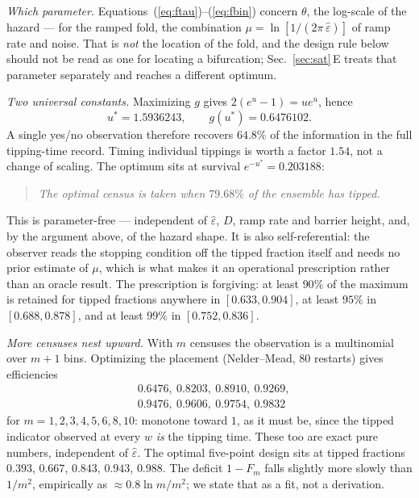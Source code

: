 \documentclass[%
 twocolumn,
 superscriptaddress,
 amsmath,amssymb,
 aps,
 pre,
 floatfix,
]{revtex4-2}
\newcommand{\Sig}{\hat\varepsilon}
\begin{document}
\emph{Which parameter.}  Equations~(\ref{eq:ftau})--(\ref{eq:fbin}) concern $\theta$, the log-scale of the hazard --- for the ramped fold, the combination $\mu=\ln[1/(2\pi\,\Sig)]$ of ramp rate and noise.  That is \emph{not} the location of the fold, and the design rule below should not be read as one for locating a bifurcation; Sec.~\ref{sec:sat}\,E treats that parameter separately and reaches a different optimum.

\emph{Two universal constants.}  Maximizing $g$ gives $2(e^u-1)=u e^u$, hence
\begin{equation}
\label{eq:ustar}
u^\ast=1.5936243,\qquad g(u^\ast)=0.6476102 .
\end{equation}
A single yes/no observation therefore recovers $64.8\%$ of the information in the full tipping-time record.  Timing individual tippings is worth a factor $1.54$, not a change of scaling.  The optimum sits at survival $e^{-u^\ast}=0.203188$:

\begin{quote}
\emph{The optimal census is taken when $79.68\%$ of the ensemble has tipped.}
\end{quote}

\noindent This is parameter-free --- independent of $\Sig$, $D$, ramp rate and barrier height, and, by the argument above, of the hazard shape.  It is also self-referential: the observer reads the stopping condition off the tipped fraction itself and needs no prior estimate of $\mu$, which is what makes it an operational prescription rather than an oracle result.  The prescription is forgiving: at least $90\%$ of the maximum is retained for tipped fractions anywhere in $[0.633,0.904]$, at least $95\%$ in $[0.688,0.878]$, and at least $99\%$ in $[0.752,0.836]$.

\emph{More censuses nest upward.}  With $m$ censuses the observation is a multinomial over $m+1$ bins.  Optimizing the placement (Nelder--Mead, $80$ restarts) gives efficiencies
\begin{equation}
\label{eq:nesting}
\begin{aligned}
&0.6476,\ 0.8203,\ 0.8910,\ 0.9269,\\
&0.9476,\ 0.9606,\ 0.9754,\ 0.9832
\end{aligned}
\end{equation}
for $m=1,2,3,4,5,6,8,10$: monotone toward $1$, as it must be, since the tipped indicator observed at every $w$ \emph{is} the tipping time.  These too are exact pure numbers, independent of $\Sig$.  The optimal five-point design sits at tipped fractions $0.393$, $0.667$, $0.843$, $0.943$, $0.988$.  The deficit $1-F_m$ falls slightly more slowly than $1/m^2$, empirically as ${\approx}0.8\ln m/m^2$; we state that as a fit, not a derivation.
\end{document}
